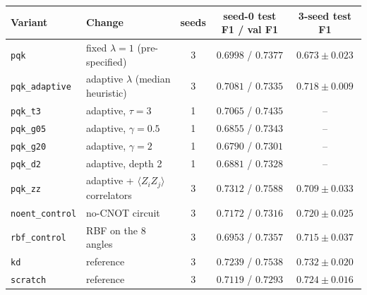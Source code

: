 \begin{tabular}{@{}llccc@{}}
\toprule
Variant & Change & seeds & seed-0 test F1 / val F1 & 3-seed test F1 \\
\midrule
\texttt{pqk} & fixed $\lambda{=}1$ (pre-specified) & 3 & $0.6998$ / $0.7377$ & $0.673\pm0.023$ \\
\texttt{pqk\_adaptive} & adaptive $\lambda$ (median heuristic) & 3 & $0.7081$ / $0.7335$ & $0.718\pm0.009$ \\
\texttt{pqk\_t3} & adaptive, $\tau{=}3$ & 1 & $0.7065$ / $0.7435$ & -- \\
\texttt{pqk\_g05} & adaptive, $\gamma{=}0.5$ & 1 & $0.6855$ / $0.7343$ & -- \\
\texttt{pqk\_g20} & adaptive, $\gamma{=}2$ & 1 & $0.6790$ / $0.7301$ & -- \\
\texttt{pqk\_d2} & adaptive, depth 2 & 1 & $0.6881$ / $0.7328$ & -- \\
\texttt{pqk\_zz} & adaptive + $\langle Z_iZ_j\rangle$ correlators & 3 & $0.7312$ / $0.7588$ & $0.709\pm0.033$ \\
\texttt{noent\_control} & no-CNOT circuit & 3 & $0.7172$ / $0.7316$ & $0.720\pm0.025$ \\
\texttt{rbf\_control} & RBF on the 8 angles & 3 & $0.6953$ / $0.7357$ & $0.715\pm0.037$ \\
\texttt{kd} & reference & 3 & $0.7239$ / $0.7538$ & $0.732\pm0.020$ \\
\texttt{scratch} & reference & 3 & $0.7119$ / $0.7293$ & $0.724\pm0.016$ \\
\bottomrule
\end{tabular}

